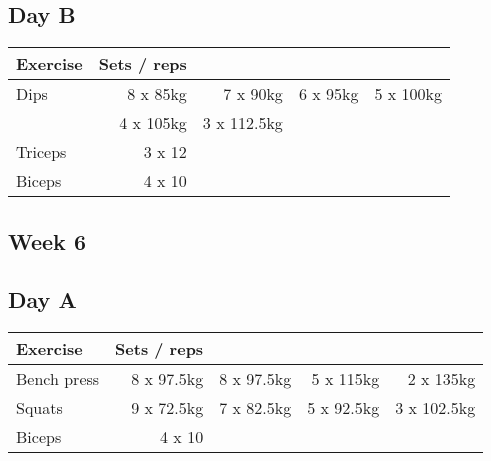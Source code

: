 \documentclass[12pt, a4paper]{article}%
\begin{document}
  \subsection*{\hspace{0.5em} Day B }


  \begin{tabular}{l|rrrr}
  \hspace{0.75em} \textbf{Exercise} & \textbf{Sets / reps} \\ \hline

            \hspace{0.75em} Dips
            & 8 x 85kg
            & 7 x 90kg
            & 6 x 95kg
            & 5 x 100kg
            \\


            \hspace{0.75em}
            & 4 x 105kg
            & 3 x 112.5kg
            & 
            & 
            \\


   \hspace{0.75em} Triceps & 3 x 12 \\
   \hspace{0.75em} Biceps & 4 x 10 \\
  \end{tabular}

 \subsection*{\hspace{0.25em} Week 6 }
  \subsection*{\hspace{0.5em} Day A }


  \begin{tabular}{l|rrrr}
  \hspace{0.75em} \textbf{Exercise} & \textbf{Sets / reps} \\ \hline

            \hspace{0.75em} Bench press
            & 8 x 97.5kg
            & 8 x 97.5kg
            & 5 x 115kg
            & 2 x 135kg
            \\


            \hspace{0.75em} Squats
            & 9 x 72.5kg
            & 7 x 82.5kg
            & 5 x 92.5kg
            & 3 x 102.5kg
            \\


   \hspace{0.75em} Biceps & 4 x 10 \\
  \end{tabular}
\end{document}
